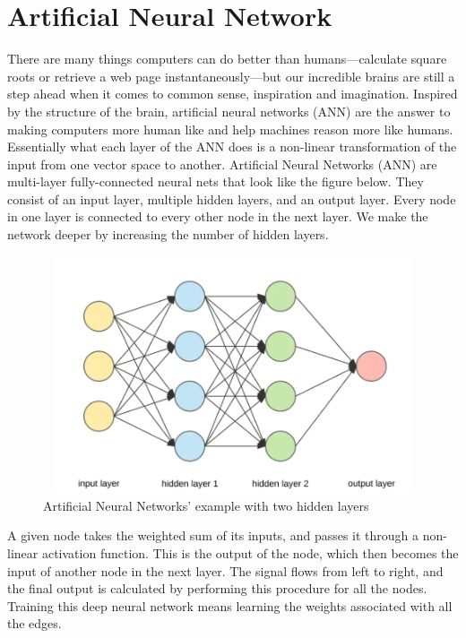 \documentclass{article}
\begin{document}
\section{Artificial Neural Network}
There are many things computers can do better than humans—calculate square roots or retrieve a web page instantaneously—but our incredible brains are still a step ahead when it comes to common sense, inspiration and imagination. Inspired by the structure of the brain, artificial neural networks (ANN) are the answer to making computers more human like and help machines reason more like humans.
Essentially what each layer of the ANN does is a non-linear transformation of the input from one vector space to another.
Artificial Neural Networks (ANN) are multi-layer fully-connected neural nets that look like the figure below. They consist of an input layer, multiple hidden layers, and an output layer. Every node in one layer is connected to every other node in the next layer. We make the network deeper by increasing the number of hidden layers.

 \begin{figure}[H]
\centering
\includegraphics[width=115mm,height=70mm]{images/ann-image.png}
\caption{\label{fig:correlation}Artificial Neural Networks' example with two hidden layers }
\label{6}
\end{figure}
A given node takes the weighted sum of its inputs, and passes it through a non-linear activation function. This is the output of the node, which then becomes the input of another node in the next layer. The signal flows from left to right, and the final output is calculated by performing this procedure for all the nodes. Training this deep neural network means learning the weights associated with all the edges.
\end{document}
